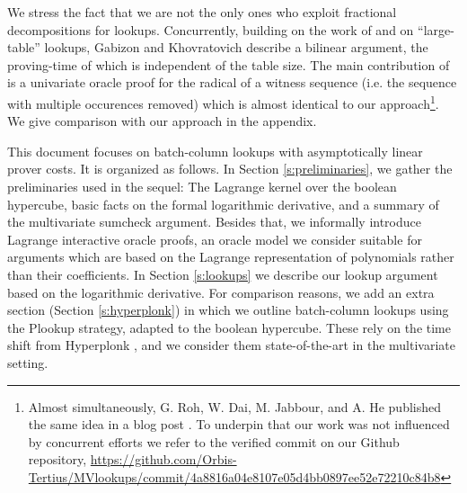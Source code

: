 \documentclass[11pt]{article}
\theoremstyle{definition}
\theoremstyle{definition}
\begin{document}
We stress the fact that we are not the only ones who exploit fractional decompositions for lookups. 
Concurrently, building on the work of \cite{Caulk} and \cite{CaulkPlus} on ``large-table'' lookups, Gabizon and Khovratovich \cite{flookup} describe a bilinear argument, the proving-time of which is independent of the table size. 
The main contribution of \cite{flookup} is a univariate oracle proof for the radical of a witness sequence (i.e. the sequence with multiple occurences removed) which is almost identical to our approach\footnote{%
Almost simultaneously, G. Roh, W. Dai, M. Jabbour, and A. He published the same idea in a blog post \cite{DaiFlookupBlog}.
To underpin that our work was not influenced by concurrent efforts we refer to the verified commit on our Github repository, 
\url{https://github.com/Orbis-Tertius/MVlookups/commit/4a8816a04e8107e05d4bb0897ee52e72210c84b8} 
}.
We give comparison with our approach in the appendix. 

This document focuses on batch-column lookups with asymptotically linear prover costs.  
It is organized as follows.
In Section \ref{s:preliminaries}, we gather the preliminaries used in the sequel: 
The Lagrange kernel over the boolean hypercube,  basic facts on the formal logarithmic derivative, and a summary of the multivariate sumcheck argument. 
Besides that, we informally introduce Lagrange interactive oracle proofs, an oracle model we consider suitable for arguments which are based on the Lagrange representation of polynomials rather than their coefficients.   
In Section \ref{s:lookups} we describe our lookup argument based on the logarithmic derivative. 
For comparison reasons, we add an extra section (Section \ref{s:hyperplonk}) in which we outline batch-column lookups using the Plookup strategy, adapted to the boolean hypercube. 
These rely on the time shift from Hyperplonk \cite{Hyperplonk}, and we consider them state-of-the-art in the multivariate setting.
\end{document}
